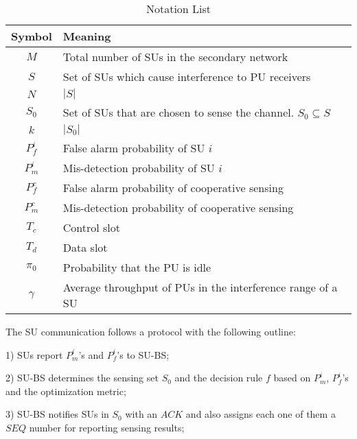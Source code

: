 \documentclass[conference]{IEEEtran}
\begin{document}
\begin{table}[t]
\centering
\caption{{\scriptsize Notation List}}
\vspace{-1em}
\begin{tabular}{|c|l|}
\hline
{\scriptsize Symbol}&{\footnotesize Meaning}\\\hline\hline
{\scriptsize $M$}&{\scriptsize Total number of SUs in the secondary network}\\\hline
{\scriptsize $S$}&{\scriptsize Set of SUs which cause interference to PU receivers}\\\hline
{\scriptsize $N$}&{\scriptsize $|S|$}\\\hline
{\scriptsize $S_0$}&{\scriptsize Set of SUs that are chosen to sense the channel. $S_0\subseteq S$}\\\hline
{\scriptsize $k$}&{\scriptsize $|S_0|$}\\\hline
{\scriptsize $P_f^i$}&{\scriptsize False alarm probability of SU $i$}\\\hline
{\scriptsize $P_m^i$}&{\scriptsize Mis-detection probability of SU $i$}\\\hline
{\scriptsize $P_f^c$}&{\scriptsize False alarm probability of cooperative sensing}\\\hline
{\scriptsize $P_m^c$}&{\scriptsize Mis-detection probability of cooperative sensing}\\\hline
{\scriptsize $T_c$}&{\scriptsize Control slot}\\\hline
{\scriptsize $T_d$}&{\scriptsize Data slot}\\\hline
{\scriptsize ${\pi}_0$}&{\scriptsize Probability that the PU is idle}\\\hline
{\scriptsize $\gamma$}&{\scriptsize Average throughput of PUs in the interference range of a SU}\\\hline
\end{tabular}
\label{tab:not}
\vspace{-1em}
\end{table}

The SU communication follows a protocol with the following outline:

1) SUs report $P_m^i$'s and $P_f^i$'s to SU-BS;

2) SU-BS determines the sensing set $S_0$ and the decision rule $f$ based on $P_m^i$, $P_f^i$'s and the optimization metric;

3) SU-BS notifies SUs in $S_0$ with an $ACK$ and also assigns each one of them a $SEQ$ number for reporting sensing results;
\end{document}
